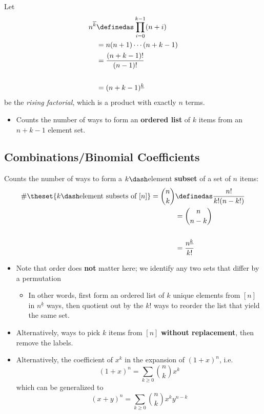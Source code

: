 Let \[\begin{aligned}
n^{\overline k} &\definedas \prod_{i=0}^{k-1}(n+i) \\ &=n(n+1) \cdots (n+k-1)
\\&= \frac{(n+k-1)!}{(n-1)!} \\ \\&= (n+k-1)^{\underline k}
\end{aligned}\] be the \emph{rising factorial}, which is a product with
exactly \(n\) terms.

\begin{itemize}
\tightlist
\item
  Counts the number of ways to form an \textbf{ordered list} of \(k\)
  items from an \(n+k-1\) element set.
\end{itemize}

\hypertarget{combinationsbinomial-coefficients}{%
\subsection{Combinations/Binomial
Coefficients}\label{combinationsbinomial-coefficients}}

Counts the number of ways to form a \(k\dash\)element \textbf{subset} of
a set of \(n\) items: \[
\begin{aligned}
\#\theset{k\dash\text{element subsets of } [n]} = {n \choose k} &\definedas \frac{n!}{k!(n-k!)} \\
&= {n \choose n-k} \\ \\
&= \frac{n^{\underline k}}{k!}
\end{aligned}
\]

\begin{itemize}
\tightlist
\item
  Note that order does \textbf{not} matter here; we identify any two
  sets that differ by a permutation

  \begin{itemize}
  \tightlist
  \item
    In other words, first form an ordered list of \(k\) unique elements
    from \([n]\) in \(n^{\underline k}\) ways, then quotient out by the
    \(k!\) ways to reorder the list that yield the same set.
  \end{itemize}
\item
  Alternatively, ways to pick \(k\) items from \([n]\) \textbf{without
  replacement}, then remove the labels.
\item
  Alternatively, the coefficient of \(x^k\) in the expansion of
  \((1+x)^n\), i.e. \[
  (1+x)^n = \sum_{k\geq 0} {n\choose k} x^k
  \] which can be generalized to \[
  (x+y)^n = \sum_{k\geq 0} {n\choose k} x^ky^{n-k}
  \]
\end{itemize}

